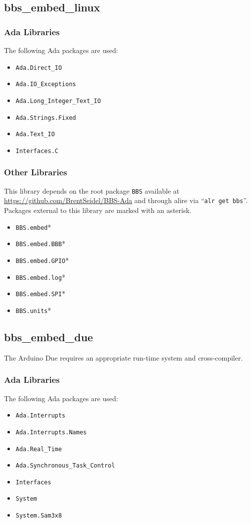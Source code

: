 \documentclass[10pt, openany]{book}
\newcommand{\package}[1]{\texttt{#1}}
\newcommand{\keyword}[1]{\texttt{#1}}
\begin{document}
\subsection{bbs\_embed\_linux}
\subsubsection{Ada Libraries}
The following Ada packages are used:
\begin{itemize}
  \item \package{Ada.Direct\_IO}
  \item \package{Ada.IO\_Exceptions}
  \item \package{Ada.Long\_Integer\_Text\_IO}
  \item \package{Ada.Strings.Fixed}
  \item \package{Ada.Text\_IO}
  \item \package{Interfaces.C}
\end{itemize}
\subsubsection{Other Libraries}
This library depends on the root package \package{BBS} available at \url{https://github.com/BrentSeidel/BBS-Ada} and through alire via ``\keyword{alr get bbs}''.  Packages external to this library are marked with an asterisk.
\begin{itemize}
  \item \package{BBS.embed}*
  \item \package{BBS.embed.BBB}*
  \item \package{BBS.embed.GPIO}*
  \item \package{BBS.embed.log}*
  \item \package{BBS.embed.SPI}*
  \item \package{BBS.units}*
\end{itemize}

\subsection{bbs\_embed\_due}
The Arduino Due requires an appropriate run-time system and cross-compiler.
\subsubsection{Ada Libraries}
The following Ada packages are used:
\begin{itemize}
  \item \package{Ada.Interrupts}
  \item \package{Ada.Interrupts.Names}
  \item \package{Ada.Real\_Time}
  \item \package{Ada.Synchronous\_Task\_Control}
  \item \package{Interfaces}
  \item \package{System}
  \item \package{System.Sam3x8}
\end{itemize}
\end{document}
